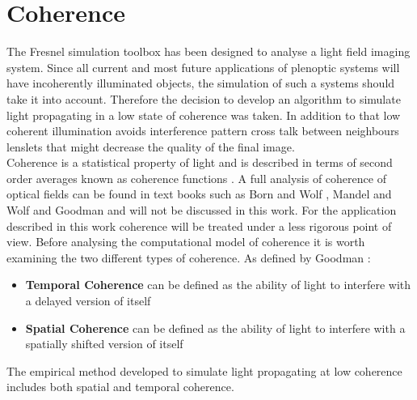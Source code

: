 \section{Coherence}
\label{sec:coherence}
The Fresnel simulation toolbox has been designed to analyse a light field imaging system. Since all current and most future applications of plenoptic systems will have incoherently illuminated objects, the simulation of such a systems should take it into account. Therefore the decision to develop an algorithm to simulate light propagating in a low state of coherence was taken. In addition to that low coherent illumination avoids interference pattern cross talk between neighbours lenslets that might decrease the quality of the final image. \\
Coherence is a statistical property of light and is described in terms of second order averages known as coherence functions \cite{goodman2015statistical,mandel1995optical}. A full analysis of coherence of optical fields can be found in text books such as Born and Wolf \cite{born1999principles}, Mandel and Wolf \cite{mandel1995optical} and Goodman \cite{goodman2015statistical} and will not be discussed in this work. For the application described in this work coherence will be treated under a less rigorous point of view. Before analysing the computational model of coherence it is worth examining the two different types of coherence. As defined by Goodman \cite{goodman2015statistical} :
\begin{itemize}
	\item \textbf{Temporal Coherence} can be defined as the ability of light to interfere with a delayed version of itself
	\item \textbf{Spatial Coherence} can be defined as the ability of light to interfere with a spatially shifted version of itself
\end{itemize}
The empirical method developed to simulate light propagating at low coherence includes both spatial and temporal coherence. 
